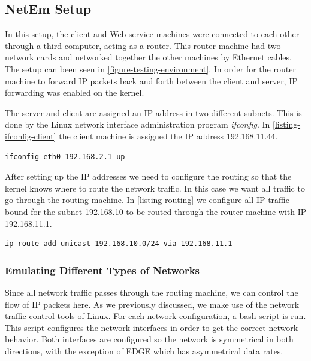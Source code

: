 \subsection{NetEm Setup}

In this setup, the client and Web service machines were connected to each other
through a third computer, acting as a router. This router machine had two
network cards and networked together the other machines by Ethernet cables. The
setup can been seen in \cref{figure-testing-environment}. In order for the
router machine to forward IP packets back and forth between the client and
server, IP forwarding was enabled on the kernel.

The server and client are assigned an IP address in two different subnets.
This is done by the Linux network interface administration program
\textit{ifconfig}. In \cref{listing-ifconfig-client} the client machine is
assigned the IP address 192.168.11.44.

\begin{lstlisting}[frame=single, caption="Configuring a network interface of the router", label=listing-ifconfig-client]
ifconfig eth0 192.168.2.1 up
\end{lstlisting}

After setting up the IP addresses we need to configure the routing so that the
kernel knows where to route the network traffic. In this case we want all
traffic to go through the routing machine. In \cref{listing-routing} we
configure all IP traffic bound for the subnet 192.168.10 to be routed through
the router machine with IP 192.168.11.1.

\begin{lstlisting}[frame=single, caption="Configuring routing rules for the client", label=listing-routing]
ip route add unicast 192.168.10.0/24 via 192.168.11.1
\end{lstlisting}

\subsubsection{Emulating Different Types of Networks}

Since all network traffic passes through the routing machine, we can control the
flow of IP packets here. As we previously discussed, we make use of the network
traffic control tools of Linux. For each network configuration, a bash script
is run. This script configures the network interfaces in order to get the
correct network behavior. Both interfaces are configured so the network is
symmetrical in both directions, with the exception of EDGE which has
asymmetrical data rates.


